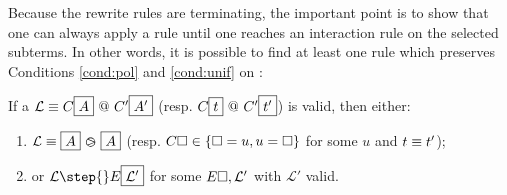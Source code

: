 


Because the rewrite rules are terminating, the important point is to show that
one can always apply a rule until one reaches an interaction rule on the
selected subterms. In other words, it is possible to find at least one rule
which preserves Conditions \ref{cond:pol} and \ref{cond:unif} on :

\begin{lemma}\label{thm:vprogress} If a  $\mathcal{L} \equiv
  C\fbox{$A$} \operatorname{\,@\,} C'\fbox{$A'$}$ (resp. $C\fbox{$t$} \operatorname{\,@\,} C'\fbox{$t'$}$) is
  valid, then either:
  \begin{enumerate}
    \item $\mathcal{L} \equiv \fbox{$A$} \operatorname{\,\varogreaterthan\,} \fbox{$A$}$ (resp. $C\square \in \{\square
    = u, u = \square\}$ for some $u$ and $t \equiv t'$);
    \item or $\mathcal{L} \step{} E\select{\mathcal{L'}}$ for some $E\square,
      \mathcal{L'}$ with $\mathcal{L'}$ valid.
  \end{enumerate}
\end{lemma}

